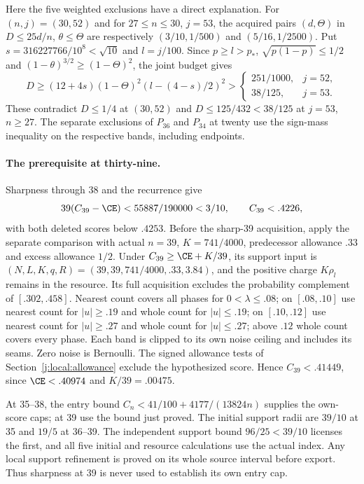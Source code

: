 Here the five weighted exclusions have a direct explanation.
For $(n,j)=(30,52)$ and for $27\le n\le30$, $j=53$, the acquired
pairs $(d,\Theta)$ in $D\le25d/n$, $\theta\le\Theta$ are respectively
$(3/10,1/500)$ and $(5/16,1/2500)$. Put
$s=316227766/10^8<\sqrt{10}$ and $l=j/100$. Since
$p\ge l>p_*$, $\sqrt{p(1-p)}\le1/2$ and
$(1-\theta)^{3/2}\ge(1-\Theta)^2$, the joint budget gives
\[
 D\ge(12+4s)(1-\Theta)^2(l-(4-s)/2)^2
 >\begin{cases}251/1000,&j=52,\\38/125,&j=53.\end{cases}
\]
These contradict $D\le1/4$ at $(30,52)$ and
$D\le125/432<38/125$ at $j=53$, $n\ge27$.
The separate exclusions of $P_{36}$ and $P_{34}$ at twenty use
the sign-mass inequality on the respective bands, including endpoints.

\paragraph{The prerequisite at thirty-nine.}
Sharpness through 38 and the recurrence give
\[
 39(C_{39}-\CE)<55887/190000<3/10,\qquad C_{39}<.4226,
\]
with both deleted scores below $.4253$. Before the sharp-39 acquisition,
apply the separate comparison with actual $n=39$, $K=741/4000$,
predecessor allowance $.33$ and excess allowance $1/2$.
Under $C_{39}\ge\CE+K/39$, its support input is
$(N,L,K,q,R)=(39,39,741/4000,.33,3.84)$, and the positive charge
$K\rho_l$ remains in the resource. Its full acquisition excludes the
probability complement of $[.302,.458]$.
Nearest count covers all phases for $0<\lambda\le.08$; on
$[.08,.10]$ use nearest count for $|u|\ge.19$ and whole count for
$|u|\le.19$; on $[.10,.12]$ use nearest count for $|u|\ge.27$
and whole count for $|u|\le.27$;
above $.12$ whole count covers every phase. Each band is clipped to its
own noise ceiling and includes its seams. Zero noise is Bernoulli.
The signed allowance tests of Section~\ref{j:local:allowance} exclude
the hypothesized score. Hence $C_{39}<.41449$, since
$\CE<.40974$ and $K/39=.00475$.

At 35--38, the entry bound
$C_n<41/100+4177/(13824n)$ supplies the own-score caps; at 39 use
the bound just proved. The initial support radii are $39/10$ at 35
and $19/5$ at 36--39. The independent support bound $96/25<39/10$
licenses the first, and all five initial and resource calculations
use the actual index. Any local support refinement is proved on its
whole source interval before export. Thus sharpness at 39 is never
used to establish its own entry cap.

